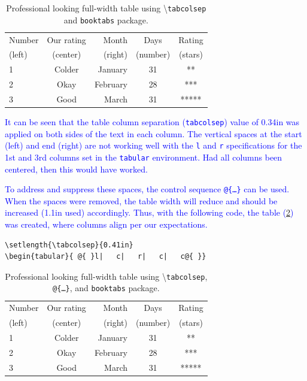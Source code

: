 \documentclass[phd,showframe]{ndsu-thesis-2022}
\newcommand\italk[1]{\textcolor{blue}{#1}}  %
\newcommand\cmd[1]{\textbackslash\texttt{#1}}  %
\newcommand\vb[1]{\textcolor{blue}{\texttt{#1}}}%
\begin{document}
\begin{table}[ht!]
\centering
\caption{Professional looking full-width table using \cmd{tabcolsep} and \texttt{booktabs} package.}
\setlength{\tabcolsep}{0.34in}
\begin{tabular}{ l|   c|   r|   c|   c}
\toprule
Number & Our rating & Month & Days & Rating\\
(left) & (center)   & (right) & (number) & (stars)\\
\midrule
1 & Colder & January & 31 & **\\
2 & Okay   & February & 28 & ***\\
3 & Good   & March & 31 & *****\\
\bottomrule
\end{tabular}
\label{tab23}
\end{table}

\italk{It can be seen that the table column separation (\vb{tabcolsep}) value of 0.34in was applied on both sides of the text in each column. The vertical spaces at the start (left) and end (right) are not working well with the \vb{l} and \vb{r} specifications for the 1st and 3rd columns set in the \vb{tabular} environment. Had all columns been centered, then this would have worked.}

\italk{To address and suppress these spaces, the control sequence \vb{@\{\ldots\}} can be used. When the spaces were removed, the table width will reduce and should be increased (1.1in used) accordingly. Thus, with the following code, the table (\cref{tab24}) was created, where columns align per our expectations.
}

{\singlespacing
\begin{verbatim}
\setlength{\tabcolsep}{0.41in}
\begin{tabular}{ @{ }l|   c|   r|   c|   c@{ }}
\end{verbatim}
}

\begin{table}[ht!]
\centering
\caption{Professional looking full-width table using \cmd{tabcolsep}, \texttt{@\{\ldots\}}, and \texttt{booktabs} package.}
\setlength{\tabcolsep}{0.41in}
\begin{tabular}{ @{ }l|   c|   r|   c|   c@{ }}
\toprule
Number & Our rating & Month & Days & Rating\\
(left) & (center)   & (right) & (number) & (stars)\\
\midrule
1 & Colder & January & 31 & **\\
2 & Okay   & February & 28 & ***\\
3 & Good   & March & 31 & *****\\
\bottomrule
\end{tabular}
\label{tab24}
\end{table}
\end{document}
